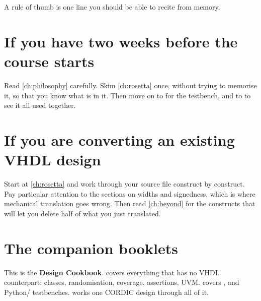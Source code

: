 \begin{ruleofthumb}
A rule of thumb is one line you should be able to recite from memory.
\end{ruleofthumb}

\section*{If you have two weeks before the course starts}

Read \cref{ch:philosophy} carefully. Skim \cref{ch:rosetta} once, without
trying to memorise it, so that you know what is in it. Then move on to
 for the testbench, and to  to see it all
used together.

\section*{If you are converting an existing VHDL design}

Start at \cref{ch:rosetta} and work through your source file construct by
construct. Pay particular attention to the sections on widths and
signedness, which is where mechanical translation goes wrong. Then read
\cref{ch:beyond} for the constructs that will let you delete half of what
you just translated.

\section*{The companion booklets}

This is the \textbf{Design Cookbook}.  covers everything
that has no VHDL counterpart: classes, randomisation, coverage, assertions,
UVM.  covers ,  and
Python/ testbenches.  works one CORDIC design
through all of it.
